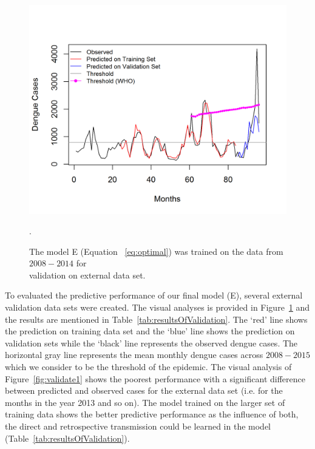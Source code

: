 \documentclass{bmcart}
\begin{document}
\begin{figure}[h!]
	\begin{center}
		\includegraphics[width= 1.0\textwidth]{Final-Prediction}
		\caption{The model E (Equation ~\ref{eq:optimal}) was trained on the data from $2008-2014$ for \\ validation on external data set.}.
		\label{fig:validate}
	\end{center}
\end{figure}




To evaluated the predictive performance of our final model (E), several external validation data sets were created.   The visual analyses is provided in Figure~\ref{fig:validate} and the results are mentioned in Table~\ref{tab:resultsOfValidation}. The `red' line shows the prediction on training data set and the `blue' line shows the prediction on validation sets while the `black' line represents the observed dengue cases. The horizontal gray line represents the mean monthly dengue cases across $2008-2015$ which we consider to be the threshold of the epidemic. The visual analysis of Figure~\ref{fig:validate1} shows the poorest performance with a significant difference between predicted and observed cases for the external data set (i.e. for the months in the year 2013 and so on). The model trained on the larger set of training data shows the better predictive performance as the influence of both, the direct and  retrospective transmission could be learned in the model (Table~\ref{tab:resultsOfValidation}).   
\end{document}
